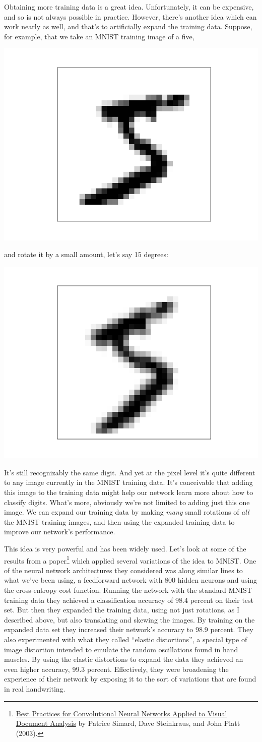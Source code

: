 \documentclass[a4paper,twoside,10pt]{book}
\begin{document}
Obtaining more training data is a great idea. Unfortunately, it can be expensive, and so is not always possible in practice. However, there's another idea which can work nearly as well, and that's to artificially expand the training data. Suppose, for example, that we take an MNIST training image of a five,
\begin{center}
	\includegraphics[width=0.15\linewidth]{figures/ch3/more_data_5}
\end{center}
and rotate it by a small amount, let's say 15 degrees:
\begin{center}
	\includegraphics[width=0.15\linewidth]{figures/ch3/more_data_rotated_5}
\end{center}
It's still recognizably the same digit. And yet at the pixel level it's quite different to any image currently in the MNIST training data. It's conceivable that adding this image to the training data might help our network learn more about how to classify digits. What's more, obviously we're not limited to adding just this one image. We can expand our training data by making \textit{many} small rotations of \textit{all} the MNIST training images, and then using the expanded training data to improve our network's performance.

This idea is very powerful and has been widely used. Let's look at some of the results from a paper\footnote{\href{http://dx.doi.org/10.1109/ICDAR.2003.1227801}{Best Practices for Convolutional Neural Networks Applied to Visual Document Analysis} by Patrice Simard, Dave Steinkraus, and John Platt (2003).} which applied several variations of the idea to MNIST. One of the neural network architectures they considered was along similar lines to what we've been using, a feedforward network with 800 hidden neurons and using the cross-entropy cost function. Running the network with the standard MNIST training data they achieved a classification accuracy of 98.4 percent on their test set. But then they expanded the training data, using not just rotations, as I described above, but also translating and skewing the images. By training on the expanded data set they increased their network's accuracy to 98.9 percent. They also experimented with what they called ``elastic distortions'', a special type of image distortion intended to emulate the random oscillations found in hand muscles. By using the elastic distortions to expand the data they achieved an even higher accuracy, 99.3 percent. Effectively, they were broadening the experience of their network by exposing it to the sort of variations that are found in real handwriting.
\end{document}
